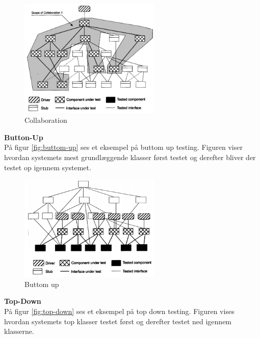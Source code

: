 \vspace{-5pt}
\begin{figure}[H]
	\centering
	\includegraphics[width=0.6\textwidth]{Billeder/Test/collaboration.png}
	\vspace{-5pt}
	\caption{Collaboration}
	\label{fig:Collaboration}
\end{figure}


\textbf{Button-Up}\\
På figur \ref{fig:buttom-up} ses et eksempel på buttom up testing. Figuren viser hvordan systemets mest grundlæggende klasser først testet og derefter bliver der testet op igennem systemet. 

\begin{figure}[H]
	\centering
	\includegraphics[width=0.6\textwidth]{Billeder/Test/buttom-up.png}
	\vspace{-5pt}
	\caption{Buttom up}
	\label{fig:Buttom_up}
\end{figure}

\newpage

\textbf{Top-Down}\\
På figur \ref{fig:top-down} ses et eksempel på top down testing. Figuren vises hvordan systemets top klasser testet først og derefter testet ned igennem klasserne.

